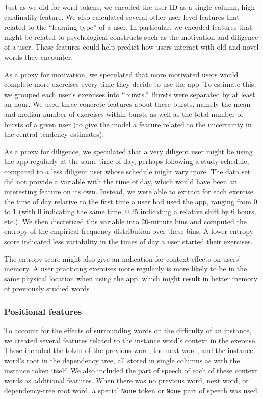 \documentclass[11pt,a4paper]{article}
\begin{document}
Just as we did for word tokens, we encoded the user ID as a single-column,
high-cardinality feature. We also calculated several other user-level features that related to the ``learning type'' of a user. In particular, we encoded features that might be related to psychological constructs such as the motivation and diligence of a user. These features could help predict how users interact with old and novel words they encounter.

As a proxy for motivation, we speculated that more motivated users would complete more exercises every time they decide to use the app. To estimate this, we grouped each user's exercises into ``bursts.'' Bursts were separated by at least an hour.  We used three
concrete features about these bursts, namely the mean and median number of
exercises within bursts as well as the total number of bursts of a given user (to give the model a feature related to the uncertainty in the central tendency estimates).

As a proxy for diligence, we speculated that a very diligent user might be using the app regularly at the same time of day, perhaps following a study schedule, compared to a less diligent user whose schedule might vary more. The data set did not provide a variable with the time of day, which would have been an interesting feature on its own. Instead, we were able to extract for each exercise the time of day relative to the first time a user had used the app, ranging from 0 to 1 (with 0 indicating the same time, 0.25 indicating a relative shift by 6 hours, etc.).  We then discretized this variable into 20-minute bins and computed the entropy of the empirical frequency distribution over these bins. A lower entropy score indicated less variability in the times of day a user started their exercises. 

The entropy score might also give an indication for context effects on users' memory. A user practicing exercises more regularly is more likely to be in the same physical location when using the app, which might result in better memory of previously studied words \cite{godden1975context}.

\subsubsection{Positional features}

To account for the effects of surrounding words on the difficulty of an
instance, we created several features related to the instance word's context in
the exercise. These included the token of the previous word, the next word, and
the instance word's root in the dependency tree, all stored in single columns as with
the instance token itself. We also included the part of speech of each of these
context words as additional features. When there was no previous word, next word, or dependency-tree
root word, a special {\tt None} token or {\tt None} part of speech was used.
\end{document}
